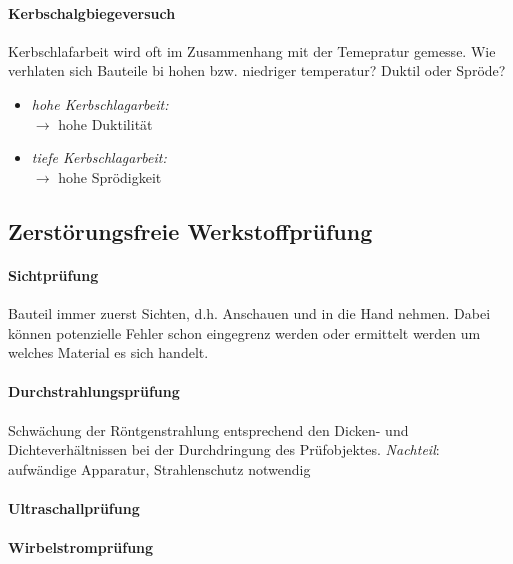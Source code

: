 \documentclass[12pt,twocolumn]{article}
\begin{document}
    \paragraph{Kerbschalgbiegeversuch}
    Kerbschlafarbeit wird oft im Zusammenhang mit der Temepratur gemesse. Wie verhlaten sich Bauteile bi hohen bzw. niedriger temperatur? Duktil oder Spröde?\\
    \begin{minipage}[t]{0.45\columnwidth}
        \begin{itemize}[label={}, leftmargin=*]
            \item \emph{hohe Kerbschlagarbeit:} \\ $\rightarrow$ hohe Duktilität
        \end{itemize}
    \end{minipage}\hfill
    \begin{minipage}[t]{0.55\columnwidth}
        \begin{itemize}[label={}, leftmargin=*]
            \item \emph{tiefe Kerbschlagarbeit:} \\ $\rightarrow$ hohe Sprödigkeit
        \end{itemize}
    \end{minipage}\hfill
    \subsection{Zerstörungsfreie Werkstoffprüfung}
    \paragraph{Sichtprüfung}
    Bauteil immer zuerst Sichten, d.h. Anschauen und in die Hand nehmen. Dabei können potenzielle Fehler schon eingegrenz werden oder ermittelt werden um welches Material es sich handelt.
    \paragraph{Durchstrahlungsprüfung}
    Schwächung der Röntgenstrahlung entsprechend den Dicken- und Dichteverhältnissen
    bei der Durchdringung des Prüfobjektes. \emph{Nachteil}: aufwändige Apparatur, Strahlenschutz notwendig
    \paragraph{Ultraschallprüfung}
    \paragraph{Wirbelstromprüfung}
\end{document}

